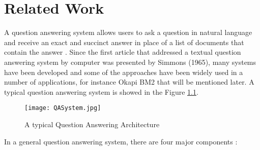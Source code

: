 \chapter{Related Work}


A question answering system allows users to ask a question in natural language and receive an exact and succinct answer in place of a list of documents that contain the answer \cite{kato2004hia, hirschman2002nlq}. Since the first article that addressed a textual question answering system by computer was presented by Simmons (1965)\cite{simmons1965aeq}, many systems have been developed and some of the approaches have been widely used in a number of applications, for instance Okapi BM2 \cite{robertson1996ot} that will be mentioned later. A typical question answering system is showed in the Figure \ref{fig: Question Answering Architecture}.

\begin{figure}[htbp]
\centering
\texttt{[image: QASystem.jpg]}
\caption{A typical Question Answering Architecture}
\label{fig: Question Answering Architecture}
\end{figure}

In a general question answering system, there are four major components \cite{tellex2003pmf, hirschman2002nlq,tellex2003qep, bilotti2004wbq}:


